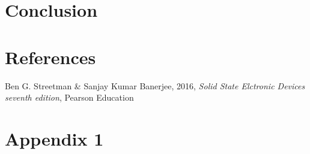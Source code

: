 \documentclass{article}
\begin{document}
\vspace{1cm}

\section{Conclusion}    \label{sec:Conclusion}


\vspace{1cm}

\section{References} \label{sec:References}

    \begin{thebibliography}{}

    Ben G. Streetman \& Sanjay Kumar Banerjee, 2016, \textit{Solid State Elctronic Devices seventh edition}, Pearson Education


    \end{thebibliography}



\appendix
\section{Appendix 1}

    \iffalse
    \begin{python}
        import numpy as np

        N = 100

        x = np.linspace(1, 100, N)

        def f(x):
            return x**2

        y = f(x)

        print(y)


        test for cpp, men er nok bedre med den andre versjonen med lstlisting

        std::cout << "index, value\n";
      for(int i = 0; i < n; i++){
          std::cout << "    " << i << ", " << d_new[i] << std::endl;
      }

    \end{python}

    \begin{lstlisting}[language = python] — må huske å ha den ekstra delen til farger osv.
    \end{lstlisting}
    \fi
\end{document}
